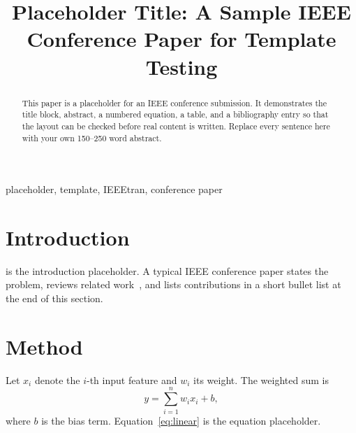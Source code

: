 \documentclass[conference]{IEEEtran}
\begin{document}
\title{Placeholder Title: A Sample IEEE Conference Paper for Template Testing}

\author{
}

\maketitle

\begin{abstract}
This paper is a placeholder for an IEEE conference submission. It demonstrates the
title block, abstract, a numbered equation, a table, and a bibliography entry so that
the layout can be checked before real content is written. Replace every sentence here
with your own 150--250 word abstract.
\end{abstract}

\begin{IEEEkeywords}
placeholder, template, IEEEtran, conference paper
\end{IEEEkeywords}

\section{Introduction}
 is the introduction placeholder. A typical IEEE conference paper
states the problem, reviews related work~\cite{lecun2015deep}, and lists contributions
in a short bullet list at the end of this section.

\section{Method}
Let $x_i$ denote the $i$-th input feature and $w_i$ its weight. The weighted sum is
\begin{equation}
  y=\sum_{i=1}^{n} w_i x_i + b,
  \label{eq:linear}
\end{equation}
where $b$ is the bias term. Equation~\eqref{eq:linear} is the equation placeholder.
\end{document}
